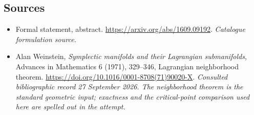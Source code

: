 \documentclass[11pt,a4paper]{article}
\numberwithin{equation}{section}
\begin{document}
\subsection{Sources}
\begin{itemize}\raggedright
\item[\textnormal{[S1]}]\hypertarget{source:statement:1}{} Formal statement, abstract.
\url{https://arxiv.org/abs/1609.09192}.
{\small\textit{Catalogue formulation source.}}
\item[\textnormal{[E1]}]\hypertarget{extra:statement:1}{} Alan Weinstein,
\emph{Symplectic manifolds and their Lagrangian submanifolds},
Advances in Mathematics 6 (1971), 329--346, Lagrangian neighborhood theorem.
\url{https://doi.org/10.1016/0001-8708(71)90020-X}.
{\small\textit{Consulted bibliographic record 27 September 2026. The
neighborhood theorem is the standard geometric input; exactness and the
critical-point comparison used here are spelled out in the attempt.}}
\end{itemize}
\end{document}
